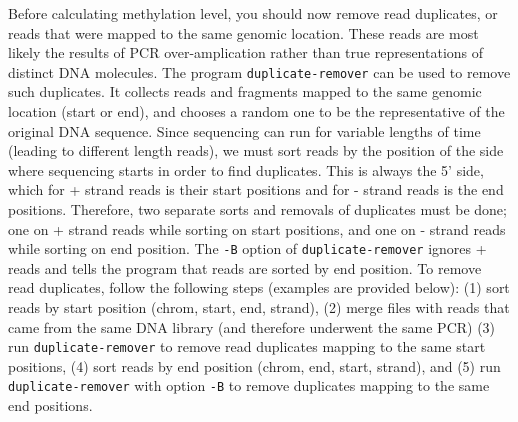 \documentclass[10pt]{article}
\newcommand{\prog}[1]{\texttt{#1}}
\newcommand{\op}[1]{\texttt{#1}}
\begin{document}
Before calculating methylation level, you should now remove read
duplicates, or reads that were mapped to the same genomic
location. These reads are most likely the results of PCR
over-amplication rather than true representations of distinct DNA
molecules. The program \prog{duplicate-remover} can be used to remove
such duplicates. It collects reads and fragments mapped to the same
genomic location (start or end), and chooses a random one to be the
representative of the original DNA sequence. Since sequencing can run
for variable lengths of time (leading to different length reads), we
must sort reads by the position of the side where sequencing starts
in order to find duplicates. This is always the 5' side, which for +
strand reads is their start positions and for - strand reads is the
end positions. Therefore, two separate sorts and removals of duplicates
must be done; one on + strand reads while sorting on start positions,
and one on - strand reads while sorting on end position. The \op{-B}
option of \prog{duplicate-remover} ignores + reads and tells the
program that reads are sorted by end position. To remove read
duplicates, follow the following steps (examples are provided below):
(1) sort reads by start position (chrom, start, end, strand), (2)
merge files with reads that came from the same DNA library (and
therefore underwent the same PCR) (3) run \prog{duplicate-remover} to
remove read duplicates mapping to the same start positions, (4) sort
reads by end position (chrom, end, start, strand), and (5) run
\prog{duplicate-remover} with option \op{-B} to remove duplicates
mapping to the same end positions.
\end{document}
